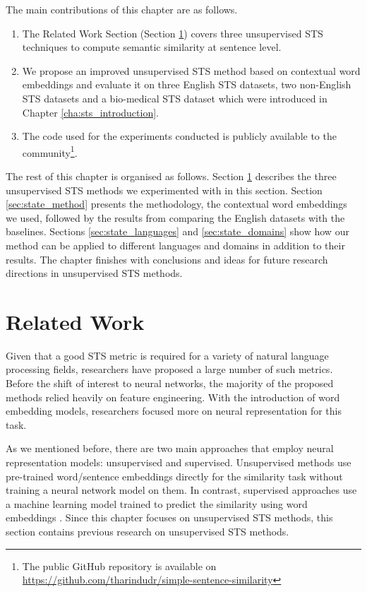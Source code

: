 The main contributions of this chapter are as follows.

\begin{enumerate}
	\item The Related Work Section (Section \ref{sec:state_related}) covers three unsupervised STS techniques to compute semantic similarity at sentence level. 
	
	\item We propose an improved unsupervised STS method based on contextual word embeddings and evaluate it on three English STS datasets, two non-English STS datasets and a bio-medical STS dataset which were introduced in Chapter \ref{cha:sts_introduction}.
	
	\item The code used for the experiments conducted is publicly available to the community\footnote{The public GitHub repository is available on \url{https://github.com/tharindudr/simple-sentence-similarity}}.
	
\end{enumerate}

The rest of this chapter is organised as follows. Section \ref{sec:state_related} describes the three unsupervised STS methods we experimented with in this section. Section \ref{sec:state_method} presents the methodology, the contextual word embeddings we used, followed by the results from comparing the English datasets with the baselines. Sections \ref{sec:state_languages} and \ref{sec:state_domains} show how our method can be applied to different languages and domains in addition to their results. The chapter finishes with conclusions and ideas for future research directions in unsupervised STS methods.


\section{Related Work}
\label{sec:state_related}
Given that a good STS metric is required for a variety of natural language processing fields, researchers have proposed a large number of such metrics. Before the shift of interest to neural networks, the majority of the proposed methods relied heavily on feature engineering. With the introduction of word embedding models, researchers focused more on neural representation for this task. 

As we mentioned before, there are two main approaches that employ neural representation models: unsupervised and supervised. Unsupervised methods use pre-trained word/sentence embeddings directly for the similarity task without training a neural network model on them. In contrast, supervised approaches use a machine learning model trained to predict the similarity using word embeddings \autocite{ranasinghe-etal-2019-enhancing}. Since this chapter focuses on unsupervised STS methods, this section contains previous research on unsupervised STS methods.


